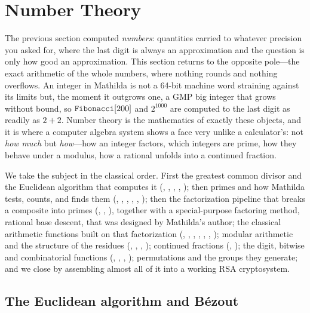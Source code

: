 \section{Number Theory}
\label{sec:numbertheory}

The previous section computed \emph{numbers}: quantities carried to whatever precision
you asked for, where the last digit is always an approximation and the question is only
how good an approximation. This section returns to the opposite pole---the exact
arithmetic of the whole numbers, where nothing rounds and nothing overflows. An integer
in Mathilda is not a 64-bit machine word straining against its limits but, the moment it
outgrows one, a GMP big integer that grows without bound, so
\(\B{Fibonacci}[200]\) and \(2^{1000}\) are computed to the last digit as readily as
\(2+2\). Number theory is the mathematics of exactly these objects, and it is where a
computer algebra system shows a face very unlike a calculator's: not \emph{how much} but
\emph{how}---how an integer factors, which integers are prime, how they behave under a
modulus, how a rational unfolds into a continued fraction.

We take the subject in the classical order. First the greatest common divisor and the
Euclidean algorithm that computes it (, , , ,
); then primes and how Mathilda tests, counts, and finds them (,
, , , , ); then the
factorization pipeline that breaks a composite into primes (,
, ), together with a special-purpose factoring method,
rational base descent, that was designed by Mathilda's author; the
classical arithmetic functions built on that factorization (,
, , , , ,
); modular arithmetic and the structure of the residues (,
, , ); continued fractions
(, ); the digit, bitwise and combinatorial
functions (, , , ); permutations
and the groups they generate; and we close by assembling almost all of it into a working
RSA cryptosystem.

\subsection{The Euclidean algorithm and B\'ezout}
\label{ssec:nt-euclid}

